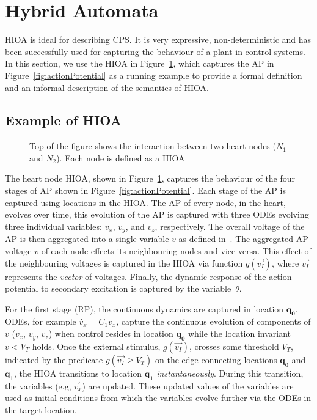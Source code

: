 \section{Hybrid Automata}
\label{sec:HA}

\acf{HIOA} is ideal for describing \ac{CPS}. It is very expressive,
non-deterministic and has been successfully used for capturing the
behaviour of a plant in control systems. In this section, we use the
\ac{HIOA} in Figure~\ref{fig:heartCellHA}, which captures the \ac{AP} in
Figure~\ref{fig:actionPotential} as a running example to provide a
formal definition and an informal description of the semantics of
\ac{HIOA}.

\subsection{Example of \acf{HIOA} }

\begin{figure}
  \centering 
  \caption{Top of the figure shows the interaction between two heart nodes 
    ($N_1$ and $N_2$). Each node is defined as a \acf{HIOA} 
    \label{fig:heartCellHA}}
\end{figure}

The heart node \ac{HIOA}, shown in Figure~\ref{fig:heartCellHA}, captures the
behaviour of the four stages of \ac{AP} shown in
Figure~\ref{fig:actionPotential}. Each stage of the \ac{AP} is captured
using locations in the \ac{HIOA}. The \ac{AP} of every node, in
the heart, evolves over time, this evolution of the \ac{AP} is captured
with three \acfp{ODE} evolving three individual variables: $v_{x}$,
$v_{y}$, and $v_{z}$, respectively. The overall voltage of the \ac{AP}
is then aggregated into a single variable $v$ as defined
in~\cite{YeESG08}. The aggregated \ac{AP} voltage $v$ of each node
effects its neighbouring nodes and vice-versa. This effect of the
neighbouring voltages is captured in the \ac{HIOA} via function
$g(\vec{v_{I}})$, where $\vec{v_{I}}$ represents the \emph{vector} of
voltages. Finally, the dynamic response of the action potential to
secondary excitation is captured by the variable~$\theta$.

For the first stage (\ac{RP}), the continuous dynamics are captured in
location $\mathbf{q_0}$. \acfp{ODE}, for example \mbox{$\dot{v_{x}} = 
C_{1}v_{x}$}, capture the continuous evolution of components of $v$ ($v_{x}$, 
$v_{y}$, $v_{z}$) when control resides in location $\mathbf{q_{0}}$ 
while the location invariant $v < V_{T}$ holds.  Once the external
stimulus, $g(\vec{v_{I}})$, crosses some threshold $V_{T}$, indicated by
the predicate \mbox{$g(\vec{v_{I}} \geq V_{T})$} on the edge connecting
locations $\mathbf{q_{0}}$ and $\mathbf{q_{1}}$, the \ac{HIOA}
transitions to location $\mathbf{q_{1}}$
\textit{instantaneously}. During this transition, the variables (e.g,
$v^{\prime}_{x}$) are updated. These updated values of the variables are
used as initial conditions from which the variables evolve further via
the \acp{ODE} in the target location.

